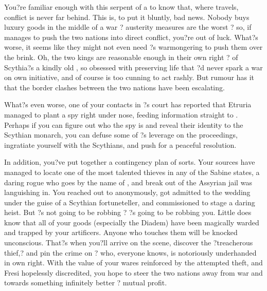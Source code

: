 \documentclass[char]{Kos}
\begin{document}
You?re familiar enough with this serpent of a \cArmsDealer{\human} to know that, where \cArmsDealer{\they} travels, conflict is never far behind. This is, to put it bluntly, bad news. Nobody buys luxury goods in the middle of a war ? austerity measures are the worst ? so, if \cArmsDealer{} manages to push the two nations into direct conflict, you?re out of luck. What?s worse, it seems like they might not even need \cArmsDealer{}?s warmongering to push them over the brink. Oh, the two kings are reasonable enough in their own right ? \cScythiaKing{} of Scythia?s a kindly old \cScythiaKing{\human}, so obsessed with preserving life that \cScythiaKing{\they}?d never spark a war on \cScythiaKing{\their} own initiative, and \cEtruriaKing{} of course is too cunning to act rashly. But rumour has it that the border clashes between the two nations have been escalating. 

What?s even worse, one of your contacts in \cScythiaKing{\Monarch} \cScythiaKing{}?s court has reported that Etruria managed to plant a spy right under \cScythiaKing{\their} nose, feeding information straight to \cEtruriaKing{}. Perhaps if you can figure out who the spy is and reveal their identity to the Scythian monarch, you can defuse some of \cEtruriaKing{}?s leverage on the proceedings, ingratiate yourself with the Scythians, and push for a peaceful resolution.

In addition, you?ve put together a contingency plan of sorts. Your sources have managed to locate one of the most talented thieves in any of the Sabine states, a daring rogue who goes by the name of \cBurglar{}, and break \cBurglar{\them} out of the Assyrian jail \cBurglar{\they} was languishing in. You reached out to \cBurglar{\them} anonymously, got \cBurglar{\them} admitted to the wedding under the guise of a Scythian fortuneteller, and commissioned \cBurglar{\them} to stage a daring heist. But \cBurglar{\they}?s not going to be robbing \cArmsDealer{} ? \cBurglar{\they}?s going to be robbing you. Little does \cBurglar{\they} know that all of your goods (especially the Diadem) have been magically warded and trapped by your artificers. Anyone who touches them will be knocked unconscious. That?s when you?ll arrive on the scene, discover the ?treacherous thief,? and pin the crime on \cArmsDealer{} ? who, everyone knows, is notoriously underhanded in \cArmsDealer{\their} own right. With the value of your wares reinforced by the attempted theft, and Fresi hopelessly discredited, you hope to steer the two nations away from war and towards something infinitely better ? mutual profit.
\end{document}
